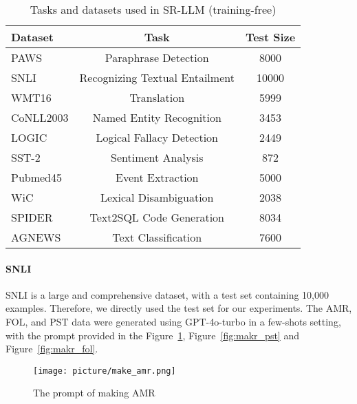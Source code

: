 \setlength{\tabcolsep}{4.5pt}
\renewcommand{\arraystretch}{1.2}
\begin{table}[!ht]
\centering
\vspace{-0.1in}
\caption{Tasks and datasets used in SR-LLM (training-free)}
\label{tab:dataset_of_tf}
\vspace{-0.1in}
\small
\resizebox{0.5\textwidth}{!}
{ 
\begin{tabular}{lcc}
\toprule
\textbf{Dataset} & \textbf{Task} & \textbf{Test Size} \\
\midrule
PAWS      & Paraphrase Detection          & 8000  \\
SNLI      & Recognizing Textual Entailment & 10000 \\
WMT16     & Translation                   & 5999  \\
CoNLL2003 & Named Entity Recognition       & 3453  \\
LOGIC      & Logical Fallacy Detection     & 2449  \\
SST-2     & Sentiment Analysis            & 872   \\
Pubmed45  & Event Extraction              & 5000  \\
WiC       & Lexical Disambiguation        & 2038  \\
SPIDER    & Text2SQL Code Generation      & 8034  \\
AGNEWS    & Text Classification           & 7600  \\
\bottomrule
\end{tabular}
} 
\vspace{-0.1in}
\end{table}

\paragraph{SNLI}
SNLI is a large and comprehensive dataset, with a test set containing 10,000 examples. Therefore, we directly used the test set for our experiments. The AMR, FOL, and PST data were generated using GPT-4o-turbo in a few-shots setting, with the prompt provided in the Figure~\ref{fig:makr_amr}, Figure~\ref{fig:makr_pst} and Figure~\ref{fig:makr_fol}.

\begin{figure}[ht]
\centering
\vspace{0in}
\texttt{[image: picture/make\_amr.png]}
\caption{The prompt of making AMR}
\label{fig:makr_amr}
\vspace{-0.1in}
\end{figure}

